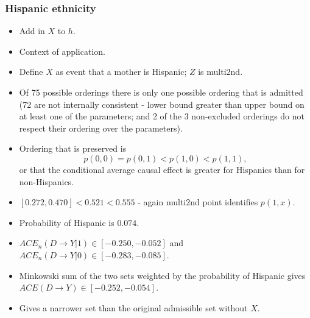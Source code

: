 \documentclass[10pt,a4paper,twoside]{article}
\numberwithin{equation}{section}
\begin{document}
\subsubsection{Hispanic ethnicity}
\color{red}
\begin{itemize}
\item Add in $X$ to $h$.
\item Context of application.
\item Define $X$ as event that a mother is Hispanic; $Z$ is multi2nd.
\item Of 75 possible orderings there is only one possible ordering that is admitted (72 are not internally consistent - lower bound greater than upper bound on at least one of the parameters; and 2 of the 3 non-excluded orderings do not respect their ordering over the parameters). 
\item Ordering that is preserved is 
\[p(0,0)=p(0,1)<p(1,0)<p(1,1),\]
or that the conditional average causal effect is greater for Hispanics than for non-Hispanics.
\item $[0.272,0.470]<0.521<0.555$ - again multi2nd point identifies $p(1,x)$. 
\item Probability of Hispanic is $0.074$. 
\item $ACE_n(D\rightarrow Y|1)\in [-0.250,-0.052]$ and $ACE_n(D\rightarrow Y|0)\in [-0.283,-0.085]$. 
\item Minkowski sum of the two sets weighted by the probability of Hispanic gives $ACE(D\rightarrow Y)\in [-0.252,-0.054]$.
\item Gives a narrower set than the original admissible set without $X$.
\end{itemize} 
\color{black}
\end{document}
